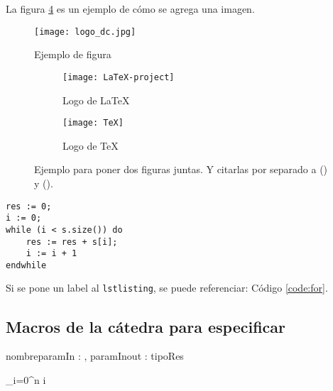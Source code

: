 \documentclass[10pt,a4paper]{article}
\begin{document}
La figura \ref{fig:subfigs} es un ejemplo de cómo se agrega una imagen.

\begin{figure}[ht]
	\centering
	\texttt{[image: logo\_dc.jpg]}
	\caption{Ejemplo de figura}
	\label{fig:ejemplo}
\end{figure}

\begin{figure}[ht!]
	\begin{subfigure}{0.5\textwidth}
		\texttt{[image: LaTeX-project]} 
		\caption{Logo de LaTeX}
		\label{fig:subfig1}
	\end{subfigure}
	\begin{subfigure}{0.5\textwidth}
		\texttt{[image: TeX]}
		\caption{Logo de TeX}
		\label{fig:subfig2}
	\end{subfigure}
	\caption{Ejemplo para poner dos figuras juntas. Y citarlas por separado a () y ().}
	\label{fig:subfigs}
\end{figure}



	\begin{lstlisting}[caption={Ejemplo de código (usando los estilos de la cátedra, ver las macros para más detalles)},label=code:for]
res := 0;
i := 0;
while (i < s.size()) do
	res := res + s[i];
	i := i + 1
endwhile
	\end{lstlisting}

Si se pone un label al \verb|lstlisting|, se puede referenciar: Código \ref{code:for}.


\subsection{Macros de la cátedra para especificar}

\begin{proc}{nombre}{\In paramIn : \nat, \Inout paramInout : \TLista{\ent}}{tipoRes}
\end{proc}

 {\sum\limits_{i=0}^{n} i}

\end{document}
